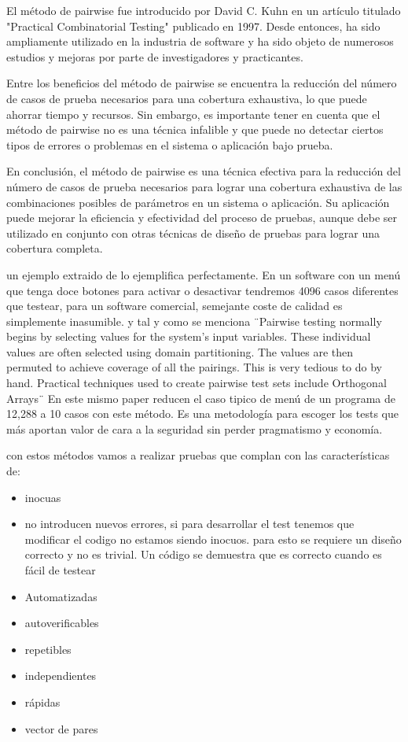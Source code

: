 El método de pairwise fue introducido por David C. Kuhn en un artículo titulado \cite{37051} "Practical Combinatorial Testing" publicado en 1997. Desde entonces, ha sido ampliamente utilizado en la industria de software y ha sido objeto de numerosos estudios y mejoras por parte de investigadores y practicantes.

Entre los beneficios del método de pairwise se encuentra la reducción del número de casos de prueba necesarios para una cobertura exhaustiva, lo que puede ahorrar tiempo y recursos. Sin embargo, es importante tener en cuenta que el método de pairwise no es una técnica infalible y que puede no detectar ciertos tipos de errores o problemas en el sistema o aplicación bajo prueba.

En conclusión, el método de pairwise es una técnica efectiva para la reducción del número de casos de prueba necesarios para lograr una cobertura exhaustiva de las combinaciones posibles de parámetros en un sistema o aplicación. Su aplicación puede mejorar la eficiencia y efectividad del proceso de pruebas, aunque debe ser utilizado en conjunto con otras técnicas de diseño de pruebas para lograr una cobertura completa.

un ejemplo extraido de \cite{Bach04pairwisetesting} lo ejemplifica perfectamente. En un software con un menú que tenga doce botones para activar o desactivar tendremos 4096 casos diferentes que testear, para un software comercial, semejante coste de calidad es simplemente inasumible. y tal y como se menciona ¨Pairwise testing normally begins by selecting values for the system’s input variables. These
individual values are often selected using domain partitioning. The values are then permuted to
achieve coverage of all the pairings. This is very tedious to do by hand. Practical techniques
used to create pairwise test sets include Orthogonal Arrays¨\cite{Bach04pairwisetesting} En este mismo paper reducen el caso tipico de menú de un programa de 12,288 a 10 casos con este método. Es una metodología para escoger los tests que más aportan valor de cara a la seguridad sin perder pragmatismo y economía.

con estos métodos vamos a realizar pruebas que complan con las características de:

\begin{itemize}
    \item inocuas
    \item no introducen nuevos errores, si para desarrollar el test tenemos que modificar el codigo no estamos siendo inocuos. para esto se requiere un diseño correcto y no es trivial. Un código se demuestra que es correcto cuando es fácil de testear
    \item Automatizadas
    \item autoverificables
    \item repetibles
    \item independientes
    \item rápidas
    \item vector de pares
\end{itemize}
